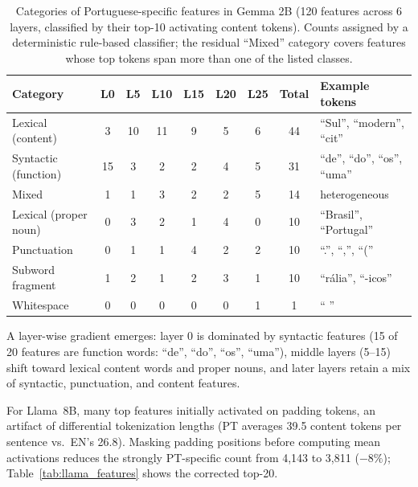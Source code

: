 \documentclass[runningheads]{llncs}
\begin{document}
\begin{table}[t]
\centering
\caption{Categories of Portuguese-specific features in Gemma 2B (120 features across 6 layers, classified by their top-10 activating content tokens). Counts assigned by a deterministic rule-based classifier; the residual ``Mixed'' category covers features whose top tokens span more than one of the listed classes.}
\label{tab:feature_categories}
\begin{tabular}{lcccccccl}
\toprule
\textbf{Category} & \textbf{L0} & \textbf{L5} & \textbf{L10} & \textbf{L15} & \textbf{L20} & \textbf{L25} & \textbf{Total} & \textbf{Example tokens} \\
\midrule
Lexical (content)        &  3 & 10 & 11 &  9 &  5 &  6 & 44 & ``Sul'', ``modern'', ``cit'' \\
Syntactic (function)     & 15 &  3 &  2 &  2 &  4 &  5 & 31 & ``de'', ``do'', ``os'', ``uma'' \\
Mixed                    &  1 &  1 &  3 &  2 &  2 &  5 & 14 & heterogeneous \\
Lexical (proper noun)    &  0 &  3 &  2 &  1 &  4 &  0 & 10 & ``Brasil'', ``Portugal'' \\
Punctuation              &  0 &  1 &  1 &  4 &  2 &  2 & 10 & ``.'', ``,'', ``('' \\
Subword fragment         &  1 &  2 &  1 &  2 &  3 &  1 & 10 & ``r\'alia'', ``-icos'' \\
Whitespace               &  0 &  0 &  0 &  0 &  0 &  1 &  1 & `` '' \\
\bottomrule
\end{tabular}
\end{table}

A layer-wise gradient emerges: layer 0 is dominated by syntactic features (15 of 20 features are function words: ``de'', ``do'', ``os'', ``uma''), middle layers (5--15) shift toward lexical content words and proper nouns, and later layers retain a mix of syntactic, punctuation, and content features.

For Llama~8B, many top features initially activated on padding tokens, an artifact of differential tokenization lengths (PT averages 39.5 content tokens per sentence vs.\ EN's 26.8). Masking padding positions before computing mean activations reduces the strongly PT-specific count from 4,143 to 3,811 ($-8\%$); Table~\ref{tab:llama_features} shows the corrected top-20.
\end{document}
